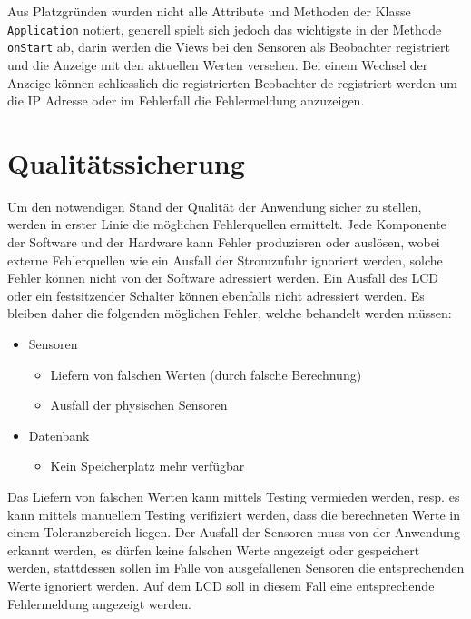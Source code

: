 \documentclass[
    10pt,
    a4paper,
]{scrartcl}
\begin{document}
Aus Platzgründen wurden nicht alle Attribute und Methoden der Klasse \texttt{Application}
notiert, generell spielt sich jedoch das wichtigste in der Methode \texttt{onStart} ab,
darin werden die Views bei den Sensoren als Beobachter registriert und die Anzeige mit den
aktuellen Werten versehen. Bei einem Wechsel der Anzeige können schliesslich die
registrierten Beobachter de-registriert werden um die IP Adresse oder im Fehlerfall die
Fehlermeldung anzuzeigen.

\section{Qualitätssicherung}
Um den notwendigen Stand der Qualität der Anwendung sicher zu stellen, werden in erster
Linie die möglichen Fehlerquellen ermittelt. Jede Komponente der Software und der Hardware
kann Fehler produzieren oder auslösen, wobei externe Fehlerquellen wie ein Ausfall der
Stromzufuhr ignoriert werden, solche Fehler können nicht von der Software adressiert
werden. Ein Ausfall des LCD oder ein festsitzender Schalter können ebenfalls nicht
adressiert werden. Es bleiben daher die folgenden möglichen Fehler, welche behandelt
werden müssen:

\begin{itemize}
    \item Sensoren
        \begin{itemize}
            \item Liefern von falschen Werten (durch falsche Berechnung)
            \item Ausfall der physischen Sensoren
        \end{itemize}
    \item Datenbank
        \begin{itemize}
            \item Kein Speicherplatz mehr verfügbar
        \end{itemize}
\end{itemize}

Das Liefern von falschen Werten kann mittels Testing vermieden werden, resp. es kann 
mittels manuellem Testing verifiziert werden, dass die berechneten Werte in einem
Toleranzbereich liegen. Der Ausfall der Sensoren muss von der Anwendung erkannt werden, es
dürfen keine falschen Werte angezeigt oder gespeichert werden, stattdessen sollen im Falle
von ausgefallenen Sensoren die entsprechenden Werte ignoriert werden. Auf dem LCD soll in
diesem Fall eine entsprechende Fehlermeldung angezeigt werden.
\end{document}
